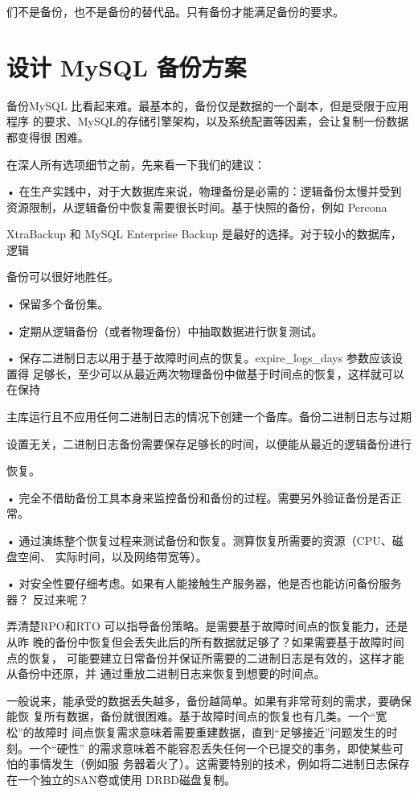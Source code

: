 们不是备份，也不是备份的替代品。只有备份才能满足备份的要求。

\section{设计 MySQL 备份方案}
备份MySQL 比看起来难。最基本的，备份仅是数据的一个副本，但是受限于应用程序
的要求、MySQL的存储引擎架构，以及系统配置等因素，会让复制一份数据都变得很
困难。

在深人所有选项细节之前，先来看一下我们的建议：

• 在生产实践中，对于大数据库来说，物理备份是必需的：逻辑备份太慢并受到
资源限制，从逻辑备份中恢复需要很长时间。基于快照的备份，例如 Percona

XtraBackup 和 MySQL Enterprise Backup 是最好的选择。对于较小的数据库，逻辑

备份可以很好地胜任。

• 保留多个备份集。

• 定期从逻辑备份（或者物理备份）中抽取数据进行恢复测试。

• 保存二进制日志以用于基于故障时间点的恢复。expire\_logs\_days 参数应该设置得
足够长，至少可以从最近两次物理备份中做基于时间点的恢复，这样就可以在保持

主库运行且不应用任何二进制日志的情况下创建一个备库。备份二进制日志与过期

设置无关，二进制日志备份需要保存足够长的时间，以便能从最近的逻辑备份进行

恢复。

• 完全不借助备份工具本身来监控备份和备份的过程。需要另外验证备份是否正常。

• 通过演练整个恢复过程来测试备份和恢复。测算恢复所需要的资源（CPU、磁盘空间、
实际时间，以及网络带宽等）。

• 对安全性要仔细考虑。如果有人能接触生产服务器，他是否也能访问备份服务器？
反过来呢？

弄清楚RPO和RTO 可以指导备份策略。是需要基于故障时间点的恢复能力，还是从昨
晚的备份中恢复但会丢失此后的所有数据就足够了？如果需要基于故障时间点的恢复，
可能要建立日常备份并保证所需要的二进制日志是有效的，这样才能从备份中还原，并
通过重放二进制日志来恢复到想要的时间点。

一般说来，能承受的数据丢失越多，备份越简单。如果有非常苛刻的需求，要确保能恢
复所有数据，备份就很困难。基于故障时间点的恢复也有几类。一个“宽松”的故障时
间点恢复需求意味着需要重建数据，直到“足够接近”问题发生的时刻。一个“硬性”
的需求意味着不能容忍丢失任何一个已提交的事务，即使某些可怕的事情发生（例如服
务器着火了）。这需要特别的技术，例如将二进制日志保存在一个独立的SAN卷或使用
DRBD磁盘复制。


